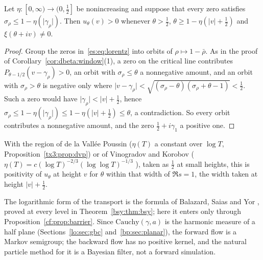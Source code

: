 \begin{corollary}\label{cf:cor:localpos}
Let $\eta:[0,\infty)\to(0,\frac12]$ be nonincreasing and suppose that every zero satisfies $\sigma_\rho\le1-\eta(\lvert\gamma_\rho\rvert)$. Then $u_\theta(v)>0$ whenever $\theta>\frac12$, $\theta\ge1-\eta(\lvert v\rvert+\frac12)$ and $\xi(\theta+iv)\ne0$.
\end{corollary}

\begin{proof}
Group the zeros in~\eqref{es:eq:lorentz} into orbits of $\rho\mapsto1-\bar\rho$. As in the proof of Corollary~\ref{cor:dbeta:window}(1), a zero on the critical line contributes $P_{\theta-1/2}(v-\gamma_\rho)>0$, an orbit with $\sigma_\rho\le\theta$ a nonnegative amount, and an orbit with $\sigma_\rho>\theta$ is negative only where $\lvert v-\gamma_\rho\rvert<\sqrt{(\sigma_\rho-\theta)(\sigma_\rho+\theta-1)}<\frac12$. Such a zero would have $\lvert\gamma_\rho\rvert<\lvert v\rvert+\frac12$, hence $\sigma_\rho\le1-\eta(\lvert\gamma_\rho\rvert)\le1-\eta(\lvert v\rvert+\frac12)\le\theta$, a contradiction. So every orbit contributes a nonnegative amount, and the zero $\frac12+i\gamma_1$ a positive one.
\end{proof}

With the region of de la Vall\'ee Poussin ($\eta(T)$ a constant over $\log T$, Proposition~\ref{tx3:prop:dvp}) or of Vinogradov and Korobov ($\eta(T)=c(\log T)^{-2/3}(\log\log T)^{-1/3}$ \cite{Vinogradov58}), taken as $\frac12$ at small heights, this is positivity of $u_\theta$ at height $v$ for $\theta$ within that width of $\Re s=1$, the width taken at height $\lvert v\rvert+\frac12$.

The logarithmic form of the transport is the formula of Balazard, Saias and Yor \cite{BSY99}, proved at every level in Theorem~\ref{bsy:thm:bsy}; here it enters only through Proposition~\ref{cf:prop:barrier}. Since $\mathrm{Cauchy}(\gamma,a)$ is the harmonic measure of a half plane (Sections~\ref{lo:sec:gbc} and~\ref{bp:sec:planar}), the forward flow is a Markov semigroup; the backward flow has no positive kernel, and the natural particle method for it is a Bayesian filter, not a forward simulation.
